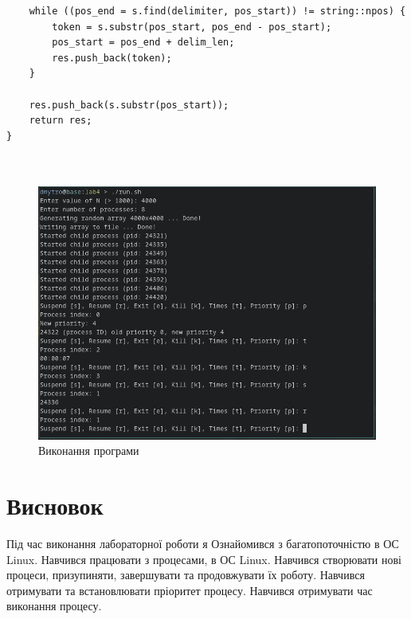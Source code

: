 \documentclass{article}
\begin{document}
\begin{normalsize}
\begin{lstlisting}
	while ((pos_end = s.find(delimiter, pos_start)) != string::npos) {
		token = s.substr(pos_start, pos_end - pos_start);
		pos_start = pos_end + delim_len;
		res.push_back(token);
	}
	
	res.push_back(s.substr(pos_start));
	return res;
}



	\end{lstlisting}
	
	\begin{figure}[H]
		\centering
		\includegraphics[scale=0.6]{v}
		\caption{Виконання програми}
	\end{figure}
	
	\section*{Висновок}
	Під час виконання лабораторної роботи я Ознайомився з багатопоточністю в ОС Linux. Навчився працювати з процесами, в ОС Linux. 	
	Навчився створювати нові процеси, призупиняти, завершувати та продовжувати їх роботу.
	Навчився отримувати та встановлювати пріоритет процесу.
	Навчився отримувати час виконання процесу.
	
	 
\end{normalsize}
\end{document}
